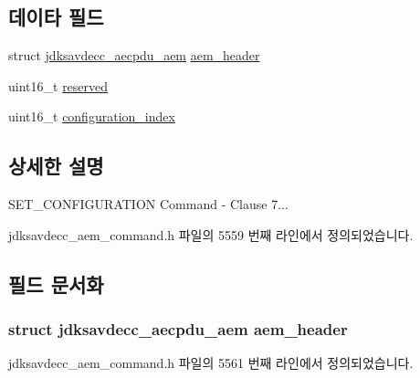 \subsection*{데이타 필드}
\begin{DoxyCompactItemize}
\item 
struct \hyperlink{structjdksavdecc__aecpdu__aem}{jdksavdecc\+\_\+aecpdu\+\_\+aem} \hyperlink{structjdksavdecc__aem__command__set__configuration_ae1e77ccb75ff5021ad923221eab38294}{aem\+\_\+header}
\item 
uint16\+\_\+t \hyperlink{structjdksavdecc__aem__command__set__configuration_a5a6ed8c04a3db86066924b1a1bf4dad3}{reserved}
\item 
uint16\+\_\+t \hyperlink{structjdksavdecc__aem__command__set__configuration_afaad1bd7c66f9611e134d8c5ce98f444}{configuration\+\_\+index}
\end{DoxyCompactItemize}


\subsection{상세한 설명}
S\+E\+T\+\_\+\+C\+O\+N\+F\+I\+G\+U\+R\+A\+T\+I\+ON Command -\/ Clause 7... 

jdksavdecc\+\_\+aem\+\_\+command.\+h 파일의 5559 번째 라인에서 정의되었습니다.



\subsection{필드 문서화}
\subsubsection[{\texorpdfstring{aem\+\_\+header}{aem_header}}]{\setlength{\rightskip}{0pt plus 5cm}struct {\bf jdksavdecc\+\_\+aecpdu\+\_\+aem} aem\+\_\+header}\hypertarget{structjdksavdecc__aem__command__set__configuration_ae1e77ccb75ff5021ad923221eab38294}{}\label{structjdksavdecc__aem__command__set__configuration_ae1e77ccb75ff5021ad923221eab38294}


jdksavdecc\+\_\+aem\+\_\+command.\+h 파일의 5561 번째 라인에서 정의되었습니다.

